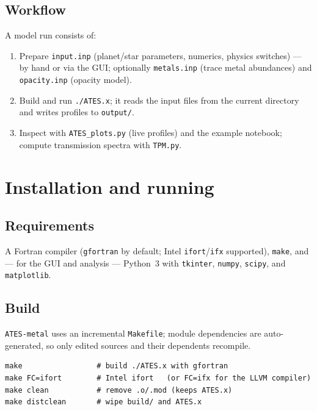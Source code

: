 \documentclass[english,a4paper]{kiseon_memo}
\begin{document}
\subsection{Workflow}
A model run consists of:
\begin{enumerate}\itemsep2pt
\item Prepare \texttt{input.inp} (planet/star parameters, numerics, physics
  switches) --- by hand or via the GUI; optionally \texttt{metals.inp} (trace
  metal abundances) and \texttt{opacity.inp} (opacity model).
\item Build and run \texttt{./ATES.x}; it reads the input files from the current
  directory and writes profiles to \texttt{output/}.
\item Inspect with \texttt{ATES\_plots.py} (live profiles) and the example
  notebook; compute transmission spectra with \texttt{TPM.py}.
\end{enumerate}

\section{Installation and running}

\subsection{Requirements}
A Fortran compiler (\texttt{gfortran} by default; Intel \texttt{ifort}/\texttt{ifx}
supported), \texttt{make}, and --- for the GUI and analysis --- Python~3 with
\texttt{tkinter}, \texttt{numpy}, \texttt{scipy}, and \texttt{matplotlib}.

\subsection{Build}
\texttt{ATES-metal} uses an incremental \texttt{Makefile}; module dependencies
are auto-generated, so only edited sources and their dependents recompile.
\begin{lstlisting}[style=sh]
make                 # build ./ATES.x with gfortran
make FC=ifort        # Intel ifort   (or FC=ifx for the LLVM compiler)
make clean           # remove .o/.mod (keeps ATES.x)
make distclean       # wipe build/ and ATES.x
\end{lstlisting}
\end{document}
